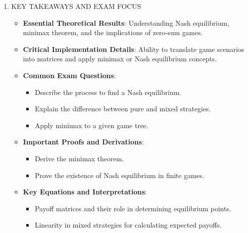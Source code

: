 \documentclass[
  12pt,
]{report}
\providecommand{\tightlist}{%
  \setlength{\itemsep}{0pt}\setlength{\parskip}{0pt}}
\begin{document}
\begin{enumerate}
  \begin{itemize}
  \item
    \textbf{Prisoner's Dilemma}: Illustrates the conflict between individual rationality and collective benefit. The Nash equilibrium results in both players defecting, despite mutual cooperation yielding a better collective outcome.
  \item
    \textbf{Game Tree Representations}: Used in AI for modeling decisions in games, such as chess or poker, and transitioning from single-agent reinforcement learning scenarios to multi-agent contexts.
  \end{itemize}
\item
  KEY TAKEAWAYS AND EXAM FOCUS

  \begin{itemize}
  \item
    \textbf{Essential Theoretical Results}: Understanding Nash equilibrium, minimax theorem, and the implications of zero-sum games.
  \item
    \textbf{Critical Implementation Details}: Ability to translate game scenarios into matrices and apply minimax or Nash equilibrium concepts.
  \item
    \textbf{Common Exam Questions}:

    \begin{itemize}
    \tightlist
    \item
      Describe the process to find a Nash equilibrium.
    \item
      Explain the difference between pure and mixed strategies.
    \item
      Apply minimax to a given game tree.
    \end{itemize}
  \item
    \textbf{Important Proofs and Derivations}:

    \begin{itemize}
    \tightlist
    \item
      Derive the minimax theorem.
    \item
      Prove the existence of Nash equilibrium in finite games.
    \end{itemize}
  \item
    \textbf{Key Equations and Interpretations}:

    \begin{itemize}
    \tightlist
    \item
      Payoff matrices and their role in determining equilibrium points.
    \item
      Linearity in mixed strategies for calculating expected payoffs.
    \end{itemize}
  \end{itemize}
\end{enumerate}
\end{document}
